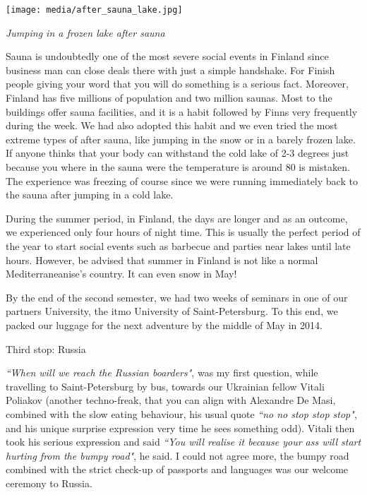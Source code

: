 \documentclass[10pt,a4paper]{article} %
\newcommand{\NewsItem}[1]{ %
\usefont{T1}{fvs}{n}{n} %
\vspace{24pt}\large #1\vspace{3pt} %
\par \normalsize \normalfont}
\begin{document}
\begin{multicols}{3}
\begin{center}
	\texttt{[image: media/after\_sauna\_lake.jpg]}
	\par\textit{Jumping in a frozen lake after sauna}
\end{center}

Sauna is undoubtedly one of the most severe social events in Finland
since business man can close deals there with just a simple handshake. 
For Finish people giving your word that you will do something is a serious fact. 
Moreover, Finland has five millions of population and two million saunas. 
Most to the buildings offer sauna facilities, and it is a habit followed by Finns 
very frequently during the week. 
We had also adopted this habit and we even tried the most extreme types of after 
sauna, like jumping in the snow or in a barely frozen lake. 
If anyone thinks that your body can withstand the cold lake of 2-3 degrees just 
because you where in the sauna were the temperature is around 80 is mistaken. 
The experience was freezing of course since we were running immediately back to the 
sauna after jumping in a cold lake.  

During the summer period, in Finland, the days are longer and as an outcome,
we experienced only four hours of night time. 
This is usually the perfect period of the year to start social events such as 
barbecue and parties near lakes until late hours. 
However, be advised that summer in Finland is not like a normal Mediterraneanise's 
country. 
It can even snow in May! 

By the end of the second semester, we had two weeks of seminars in one of our 
partners University, the {\sc itmo} University of Saint-Petersburg. 
To this end, we packed our luggage for the next adventure by the middle of May 
in 2014.	

\NewsItem{Third stop: Russia}
\textit{``When will we reach the Russian boarders"}, was my first question, while 
travelling to Saint-Petersburg by bus, towards our Ukrainian fellow Vitali 
Poliakov  (another techno-freak, that you can align with Alexandre De Masi, 
combined with the slow eating behaviour, his usual quote 
\textit{``no no stop stop stop"}, and his unique surprise expression very time 
he sees something odd). 
Vitali then took his serious expression and said \textit{``You will realise it 
	because your ass will start hurting from the bumpy road"}, he said. 
I could not agree more, the bumpy road combined with the strict check-up of 
passports and languages was our welcome ceremony to Russia.



\end{multicols}
\end{document}
